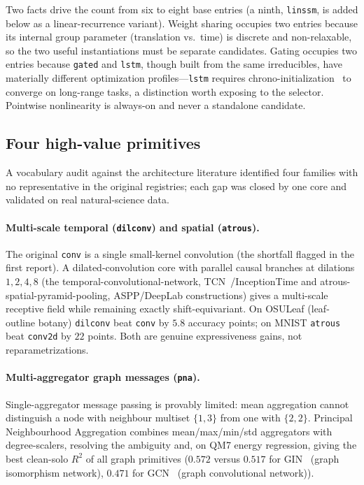 \documentclass[11pt]{article}
\newcommand{\allowbreakhere}{\discretionary{}{}{}}
\newcommand{\code}[1]{\texttt{\def\_{\char`_\allowbreakhere}#1}}
\begin{document}
Two facts drive the count from six to eight base entries (a ninth, \code{linssm}, is added below as a linear-recurrence variant). Weight sharing occupies two entries because its
internal group parameter (translation vs.\ time) is discrete and non-relaxable, so the two
useful instantiations must be separate candidates. Gating occupies two entries because
\code{gated} and \code{lstm}, though built from the same irreducibles, have materially
different optimization profiles---\code{lstm} requires chrono-initialization~\cite{tallec2018chrono} to converge on
long-range tasks, a distinction worth exposing to the selector. Pointwise nonlinearity is
always-on and never a standalone candidate.

\subsection{Four high-value primitives}
\label{sec:newprims}

A vocabulary audit against the architecture literature identified four families with no representative
in the original registries; each gap was closed by one core and validated on real natural-science data.

\paragraph{Multi-scale temporal (\code{dilconv}) and spatial (\code{atrous}).} The original
\code{conv} is a single small-kernel convolution (the shortfall flagged in the first report). A
dilated-convolution core with parallel causal branches at dilations $1,2,4,8$ (the temporal-convolutional-network, TCN~\cite{bai2018tcn}/InceptionTime
and atrous-spatial-pyramid-pooling, ASPP/DeepLab constructions) gives a multi-scale receptive field while remaining exactly
shift-equivariant. On OSULeaf (leaf-outline botany) \code{dilconv} beat \code{conv} by $5.8$ accuracy
points; on MNIST \code{atrous} beat \code{conv2d} by $22$ points. Both are genuine expressiveness
gains, not reparametrizations.

\paragraph{Multi-aggregator graph messages (\code{pna}).} Single-aggregator message passing is
provably limited: mean aggregation cannot distinguish a node with neighbour multiset $\{1,3\}$ from one
with $\{2,2\}$. Principal Neighbourhood Aggregation combines mean/max/min/std aggregators with
degree-scalers, resolving the ambiguity and, on QM7 energy regression, giving the best clean-solo
$R^2$ of all graph primitives ($0.572$ versus $0.517$ for GIN~\cite{xu2019gin} (graph isomorphism network), $0.471$ for GCN~\cite{kipf2017gcn} (graph convolutional network)).
\end{document}
